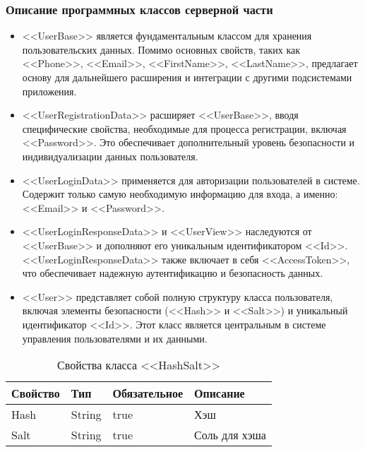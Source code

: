 \subsubsection{Описание программных классов серверной части}

\begin{itemize}
    \item <<UserBase>> является фундаментальным классом для хранения пользовательских данных. Помимо основных свойств, таких как <<Phone>>, <<Email>>, <<FirstName>>, <<LastName>>, предлагает основу для дальнейшего расширения и интеграции с другими подсистемами приложения.
    \item <<UserRegistrationData>> расширяет <<UserBase>>, вводя специфические свойства, необходимые для процесса регистрации, включая <<Password>>. Это обеспечивает дополнительный уровень безопасности и индивидуализации данных пользователя.
    \item <<UserLoginData>> применяется для авторизации пользователей в системе. Содержит только самую необходимую информацию для входа, а именно: <<Email>> и <<Password>>.
    \item <<UserLoginResponseData>> и <<UserView>> наследуются от <<UserBase>> и дополняют его уникальным идентификатором <<Id>>. <<UserLoginResponseData>> также включает в себя <<AccessToken>>, что обеспечивает надежную аутентификацию и безопасность данных.
    \item <<User>> представляет собой полную структуру класса пользователя, включая элементы безопасности (<<Hash>> и <<Salt>>) и уникальный идентификатор <<Id>>. Этот класс является центральным в системе управления пользователями и их данными.
\end{itemize}

\begin{xltabular}{\textwidth}{|l|l|p{1.7cm}|X|}
    \caption{Свойства класса <<HashSalt>>}\\ \hline
    Свойство & Тип & Обязательное & Описание \\ \hline
    Hash & String & true & Хэш \\ \hline
    Salt & String & true & Соль для хэша \\ \hline
\end{xltabular}

